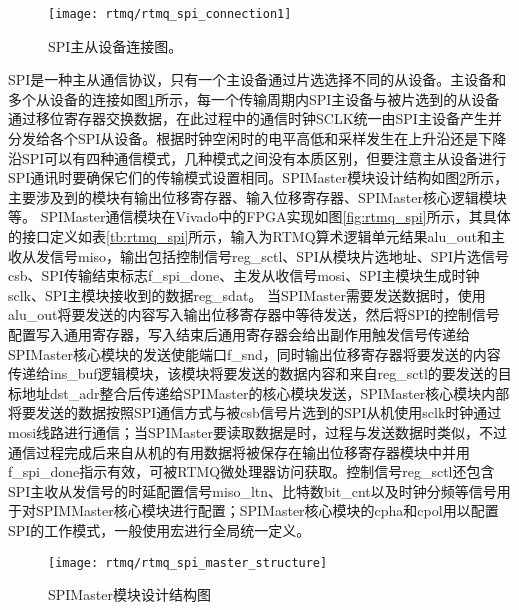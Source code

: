 \begin{figure}
    \centering
    \caption[SPI主从设备连接图]{SPI主从设备连接图。\label{fig:rtmq_spi_connection1}}
    \texttt{[image: rtmq/rtmq\_spi\_connection1]}
\end{figure}

SPI是一种主从通信协议，只有一个主设备通过片选选择不同的从设备。主设备和多个从设备的连接如图\ref{fig:rtmq_spi_connection1}所示，每一个传输周期内SPI主设备与被片选到的从设备通过移位寄存器交换数据，在此过程中的通信时钟SCLK统一由SPI主设备产生并分发给各个SPI从设备。根据时钟空闲时的电平高低和采样发生在上升沿还是下降沿SPI可以有四种通信模式，几种模式之间没有本质区别，但要注意主从设备进行SPI通讯时要确保它们的传输模式设置相同。SPIMaster模块设计结构如图\ref{fig:rtmq_spi_master_structure}所示，主要涉及到的模块有输出位移寄存器、输入位移寄存器、SPIMaster核心逻辑模块等。
SPIMaster通信模块在Vivado中的FPGA实现如图\ref{fig:rtmq_spi}所示，其具体的接口定义如表\ref{tb:rtmq_spi}所示，输入为RTMQ算术逻辑单元结果alu\_out和主收从发信号miso，输出包括控制信号reg\_sctl、SPI从模块片选地址、SPI片选信号csb、SPI传输结束标志f\_spi\_done、主发从收信号mosi、SPI主模块生成时钟sclk、SPI主模块接收到的数据reg\_sdat。
当SPIMaster需要发送数据时，使用alu\_out将要发送的内容写入输出位移寄存器中等待发送，然后将SPI的控制信号配置写入通用寄存器，写入结束后通用寄存器会给出副作用触发信号传递给SPIMaster核心模块的发送使能端口f\_snd，同时输出位移寄存器将要发送的内容传递给ins\_buf逻辑模块，该模块将要发送的数据内容和来自reg\_sctl的要发送的目标地址dst\_adr整合后传递给SPIMaster的核心模块发送，SPIMaster核心模块内部将要发送的数据按照SPI通信方式与被csb信号片选到的SPI从机使用sclk时钟通过mosi线路进行通信；当SPIMaster要读取数据是时，过程与发送数据时类似，不过通信过程完成后来自从机的有用数据将被保存在输出位移寄存器模块中并用f\_spi\_done指示有效，可被RTMQ微处理器访问获取。控制信号reg\_sctl还包含SPI主收从发信号的时延配置信号miso\_ltn、比特数bit\_cnt以及时钟分频等信号用于对SPIMMaster核心模块进行配置；SPIMaster核心模块的cpha和cpol用以配置SPI的工作模式，一般使用宏进行全局统一定义。



\begin{figure}
    \centering
    \caption[SPIMaster模块设计结构图]{SPIMaster模块设计结构图\label{fig:rtmq_spi_master_structure}}
    \texttt{[image: rtmq/rtmq\_spi\_master\_structure]}
\end{figure}


